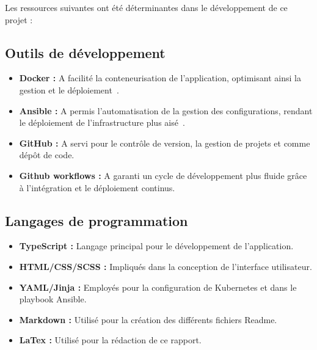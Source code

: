Les ressources suivantes ont été déterminantes dans le développement de ce projet :

\subsection{Outils de développement}\label{subsec:outils-de-developpement}
\begin{itemize}
    \item \textbf{Docker :} A facilité la conteneurisation de l'application, optimisant ainsi la gestion et le déploiement~\cite{DockerDoc:online}.
    \item \textbf{Ansible :} A permis l'automatisation de la gestion des configurations, rendant le déploiement de l'infrastructure plus aisé~\cite{AnsibleDoc:online}.
    \item \textbf{GitHub :} A servi pour le contrôle de version, la gestion de projets et comme dépôt de code.
    \item \textbf{Github workflows :} A garanti un cycle de développement plus fluide grâce à l'intégration et le déploiement continus.
\end{itemize}

\subsection{Langages de programmation}\label{subsec:langages-de-programmation}
\begin{itemize}
    \item \textbf{TypeScript :} Langage principal pour le développement de l'application.
    \item \textbf{HTML/CSS/SCSS :} Impliqués dans la conception de l'interface utilisateur.
    \item \textbf{YAML/Jinja :} Employés pour la configuration de Kubernetes et dans le playbook Ansible.
    \item \textbf{Markdown :} Utilisé pour la création des différents fichiers Readme.
    \item \textbf{LaTex :} Utilisé pour la rédaction de ce rapport.
\end{itemize}

